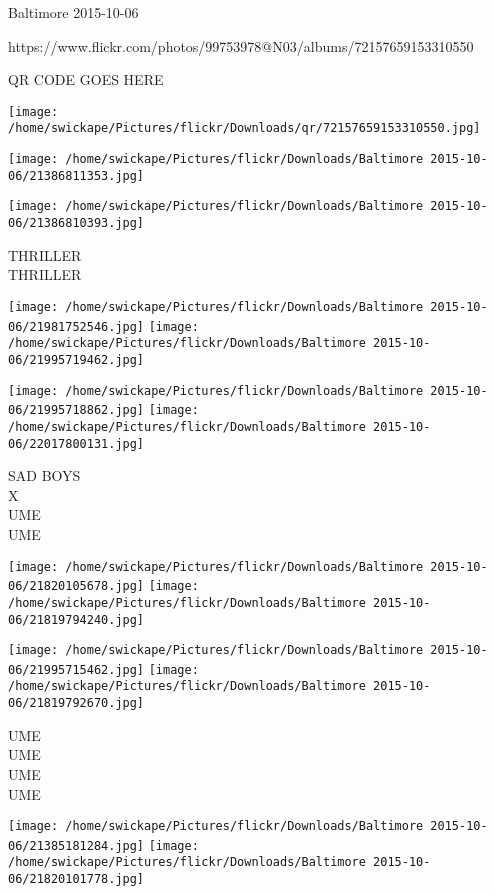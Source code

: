 \documentclass[10pt,letterpaper]{article}
\begin{document}
Baltimore 2015-10-06

https://www.flickr.com/photos/99753978@N03/albums/72157659153310550

QR CODE GOES HERE

\texttt{[image: /home/swickape/Pictures/flickr/Downloads/qr/72157659153310550.jpg]}
\pagebreak

\texttt{[image: /home/swickape/Pictures/flickr/Downloads/Baltimore 2015-10-06/21386811353.jpg]}

\vspace{0.25in}
\texttt{[image: /home/swickape/Pictures/flickr/Downloads/Baltimore 2015-10-06/21386810393.jpg]}

THRILLER\\
THRILLER\\
\pagebreak

\texttt{[image: /home/swickape/Pictures/flickr/Downloads/Baltimore 2015-10-06/21981752546.jpg]}
\texttt{[image: /home/swickape/Pictures/flickr/Downloads/Baltimore 2015-10-06/21995719462.jpg]}

\texttt{[image: /home/swickape/Pictures/flickr/Downloads/Baltimore 2015-10-06/21995718862.jpg]}
\texttt{[image: /home/swickape/Pictures/flickr/Downloads/Baltimore 2015-10-06/22017800131.jpg]}

SAD BOYS\\
X\\
UME\\
UME\\
\pagebreak

\texttt{[image: /home/swickape/Pictures/flickr/Downloads/Baltimore 2015-10-06/21820105678.jpg]}
\texttt{[image: /home/swickape/Pictures/flickr/Downloads/Baltimore 2015-10-06/21819794240.jpg]}

\texttt{[image: /home/swickape/Pictures/flickr/Downloads/Baltimore 2015-10-06/21995715462.jpg]}
\texttt{[image: /home/swickape/Pictures/flickr/Downloads/Baltimore 2015-10-06/21819792670.jpg]}

UME\\
UME\\
UME\\
UME\\
\pagebreak

\texttt{[image: /home/swickape/Pictures/flickr/Downloads/Baltimore 2015-10-06/21385181284.jpg]}
\texttt{[image: /home/swickape/Pictures/flickr/Downloads/Baltimore 2015-10-06/21820101778.jpg]}
\end{document}
